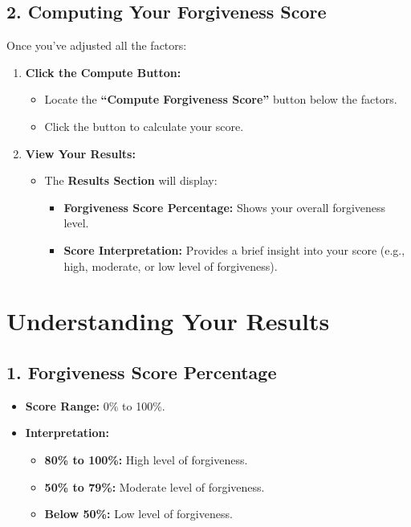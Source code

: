 \documentclass[11pt]{article}
\begin{document}
\subsection*{2. Computing Your Forgiveness Score}

Once you've adjusted all the factors:

\begin{enumerate}
    \item \textbf{Click the Compute Button:}
    \begin{itemize}
        \item Locate the \textbf{``Compute Forgiveness Score''} button below the factors.
        \item Click the button to calculate your score.
    \end{itemize}
    \item \textbf{View Your Results:}
    \begin{itemize}
        \item The \textbf{Results Section} will display:
        \begin{itemize}
            \item \textbf{Forgiveness Score Percentage:} Shows your overall forgiveness level.
            \item \textbf{Score Interpretation:} Provides a brief insight into your score (e.g., high, moderate, or low level of forgiveness).
        \end{itemize}
    \end{itemize}
\end{enumerate}

\section*{Understanding Your Results}

\subsection*{1. Forgiveness Score Percentage}

\begin{itemize}
    \item \textbf{Score Range:} 0\% to 100\%.
    \item \textbf{Interpretation:}
    \begin{itemize}
        \item \textbf{80\% to 100\%:} High level of forgiveness.
        \item \textbf{50\% to 79\%:} Moderate level of forgiveness.
        \item \textbf{Below 50\%:} Low level of forgiveness.
    \end{itemize}
\end{itemize}
\end{document}
